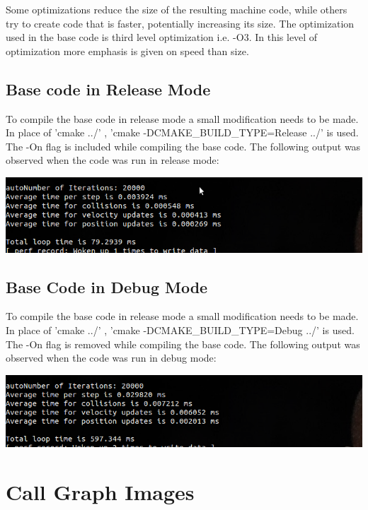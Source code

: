 \documentclass [11pt]{report}
\begin{document}
Some optimizations reduce the size of the resulting machine code, while others try to create code that is faster, potentially increasing its size.
The optimization used in the base code is third level optimization i.e. -O3. In this level of optimization more emphasis is given on speed than size.

\subsection{Base code in Release Mode}
To compile the base code in release mode a small modification needs to be made. In place of 'cmake ../' , 'cmake -DCMAKE\_BUILD\_TYPE=Release ../' is used. The -On flag is included while compiling the base code.
The following output was observed when the code was run in release mode:\\
\begin{center}
\includegraphics[scale=0.6]{./images/release.png}
\end{center}

\subsection{Base Code in Debug Mode}
To compile the base code in release mode a small modification needs to be made. In place of 'cmake ../' , 'cmake -DCMAKE\_BUILD\_TYPE=Debug ../' is used. The -On flag is removed while compiling the base code.
The following output was observed when the code was run in debug mode:\\
\begin{center}
\includegraphics[scale=0.6]{./images/debug.png}
\end{center}



\section{Call Graph Images}
\end{document}
